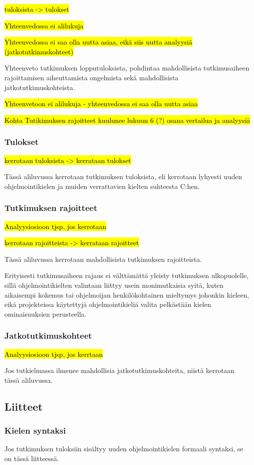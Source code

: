 \hl{tuloksista -> tulokset}

\hl{Yhteenvedossa ei alilukuja}

\hl{Yhteenvedossa ei saa olla uutta asiaa, eikä siis uutta analyysiä
(jatkotutkimuskohteet)}

Yhteenveto tutkimuksen lopputuloksista, pohdintaa mahdollisista tutkimusaiheen
rajoittamisen aiheuttamista ongelmista sekä mahdollisista
jatkotutkimuskohteista.

\hl{Yhteenvetoon ei alilukuja - yhteenvedossa ei saa olla uutta asiaa}

\hl{Kohta Tutikimuksen rajoitteet kuulunee lukuun 6 (?) osana vertailua ja
analyysiä}

\subsubsection{Tulokset}

\hl{kerrotaan tuloksista -> kerrataan tulokset}

Tässä aliluvussa kerrotaan tutkimuksen tuloksista, eli kerrotaan lyhyesti uuden
ohjelmointikielen ja muiden verrattavien kielten suhteesta C:hen.

\subsubsection{Tutkimuksen rajoitteet}

\hl{Analyysiosioon tjsp, jos kerrotaan}

\hl{kerrotaan rajoitteista -> kerrataan rajoitteet}

Tässä aliluvussa kerrotaan mahdollisista tutkimuksen rajoitteista.

Erityisesti tutkimusaiheen rajaus ei välttämättä yleisty tutkimuksen
ulkopuolelle, sillä ohjelmointikielten valintaan liittyy usein monimutkaisia
syitä, kuten aikaisempi kokemus tai ohjelmoijan henkilökohtainen mieltymys
johonkin kieleen, eikä projekteissa käytettyjä ohjelmointikieliä valita
pelkästään kielen ominaisuuksien perusteella.

\subsubsection{Jatkotutkimuskohteet}

\hl{Analyysiosioon tjsp, jos kerrtaan}

Jos tutkielmassa ilmenee mahdollisia jatkotutkimuskohteita, niistä kerrotaan
tässä aliluvussa.

\renewcommand{\thesubsubsection}{Liite \arabic{subsubsection}. }

\subsection{Liitteet}

\subsubsection{Kielen syntaksi}

Jos tutkimuksen tuloksiin sisältyy uuden ohjelmointikielen formaali syntaksi,
se on tässä liitteessä.
